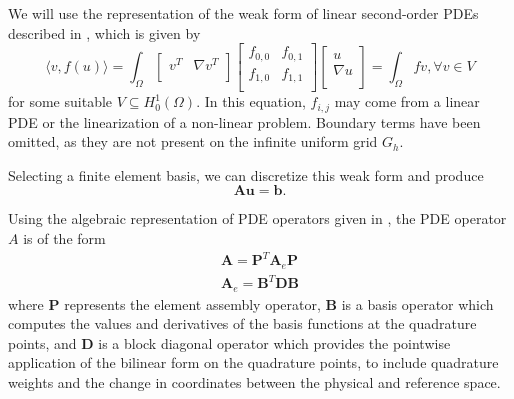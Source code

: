 \documentclass[review]{siamart190516}
\begin{document}
We will use the representation of the weak form of linear second-order PDEs described in \cite{brown2010efficient}, which is given by
\begin{equation}
\langle v, f \left( u \right) \rangle = \int_{\Omega}
\begin{bmatrix}
  v^T & \nabla v^T    \\
\end{bmatrix}
\begin{bmatrix}
  f_{0, 0} & f_{0, 1} \\
  f_{1, 0} & f_{1, 1} \\
\end{bmatrix}
\begin{bmatrix}
  u                   \\
  \nabla u            \\
\end{bmatrix}
= \int_{\Omega} f v, \forall v \in V
\end{equation}
for some suitable $V \subseteq H_0^1 \left( \Omega \right)$.
In this equation, $f_{i, j}$ may come from a linear PDE or the linearization of a non-linear problem.
Boundary terms have been omitted, as they are not present on the infinite uniform grid $G_h$.

Selecting a finite element basis, we can discretize this weak form and produce
\begin{equation}\label{pdediscrete}
\mathbf{A} \mathbf{u} = \mathbf{b}.
\end{equation}

Using the algebraic representation of PDE operators given in \cite{brown2010efficient}, the PDE operator $A$ is of the form
\begin{equation}\label{efficienthighorder}
\begin{split}
\mathbf{A} = \mathbf{P}^T \mathbf{A}_e \mathbf{P}\\
\mathbf{A}_e = \mathbf{B}^T \mathbf{D} \mathbf{B}
\end{split}
\end{equation}
where $\mathbf{P}$ represents the element assembly operator, $\mathbf{B}$ is a basis operator which computes the values and derivatives of the basis functions at the quadrature points, and $\mathbf{D}$ is a block diagonal operator which provides the pointwise application of the bilinear form on the quadrature points, to include quadrature weights and the change in coordinates between the physical and reference space.
\end{document}

